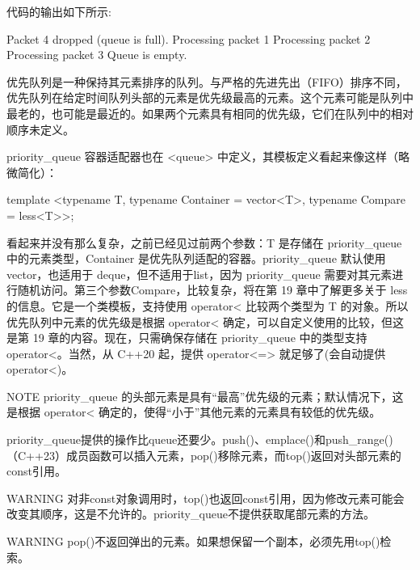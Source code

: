 代码的输出如下所示:

\begin{shell}
Packet 4 dropped (queue is full).
Processing packet 1
Processing packet 2
Processing packet 3
Queue is empty.
\end{shell}


优先队列是一种保持其元素排序的队列。与严格的先进先出（FIFO）排序不同，优先队列在给定时间队列头部的元素是优先级最高的元素。这个元素可能是队列中最老的，也可能是最近的。如果两个元素具有相同的优先级，它们在队列中的相对顺序未定义。

priority\_queue 容器适配器也在 <queue> 中定义，其模板定义看起来像这样（略微简化）：

\begin{cpp}
template <typename T, typename Container = vector<T>,
          typename Compare = less<T>>;
\end{cpp}

看起来并没有那么复杂，之前已经见过前两个参数：T 是存储在 priority\_queue 中的元素类型，Container 是优先队列适配的容器。priority\_queue 默认使用 vector，也适用于 deque，但不适用于list，因为 priority\_queue 需要对其元素进行随机访问。第三个参数Compare，比较复杂，将在第 19 章中了解更多关于 less 的信息。它是一个类模板，支持使用 operator< 比较两个类型为 T 的对象。所以优先队列中元素的优先级是根据 operator< 确定，可以自定义使用的比较，但这是第 19 章的内容。现在，只需确保存储在 priority\_queue 中的类型支持 operator<。当然，从 C++20 起，提供 operator<=> 就足够了(会自动提供 operator<)。

\begin{myNotic}{NOTE}
priority\_queue 的头部元素是具有“最高”优先级的元素；默认情况下，这是根据 operator< 确定的，使得“小于”其他元素的元素具有较低的优先级。
\end{myNotic}


priority\_queue提供的操作比queue还要少。push()、emplace()和push\_range()（C++23）成员函数可以插入元素，pop()移除元素，而top()返回对头部元素的const引用。

\begin{myWarning}{WARNING}
对非const对象调用时，top()也返回const引用，因为修改元素可能会改变其顺序，这是不允许的。priority\_queue不提供获取尾部元素的方法。
\end{myWarning}

\begin{myWarning}{WARNING}
pop()不返回弹出的元素。如果想保留一个副本，必须先用top()检索。
\end{myWarning}

